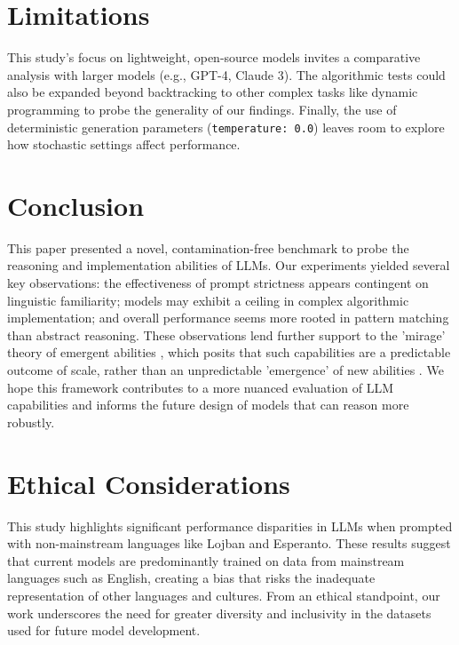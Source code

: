 \documentclass[11pt]{article}
\begin{document}
\section{Limitations}
\label{sec:limitations}
This study's focus on lightweight, open-source models invites a comparative analysis with larger models (e.g., GPT-4, Claude 3). The algorithmic tests could also be expanded beyond backtracking to other complex tasks like dynamic programming to probe the generality of our findings. Finally, the use of deterministic generation parameters (\texttt{temperature: 0.0}) leaves room to explore how stochastic settings affect performance.

\section{Conclusion}
\label{sec:conclusion}
This paper presented a novel, contamination-free benchmark to probe the reasoning and implementation abilities of LLMs. Our experiments yielded several key observations: the effectiveness of prompt strictness appears contingent on linguistic familiarity; models may exhibit a ceiling in complex algorithmic implementation; and overall performance seems more rooted in pattern matching than abstract reasoning. These observations lend further support to the 'mirage' theory of emergent abilities \cite{schaeffer2023mirage}, which posits that such capabilities are a predictable outcome of scale, rather than an unpredictable 'emergence' of new abilities \cite{wei2022emergent}. We hope this framework contributes to a more nuanced evaluation of LLM capabilities and informs the future design of models that can reason more robustly.

\section{Ethical Considerations}
\label{sec:ethical}
This study highlights significant performance disparities in LLMs when prompted with non-mainstream languages like Lojban and Esperanto. These results suggest that current models are predominantly trained on data from mainstream languages such as English, creating a bias that risks the inadequate representation of other languages and cultures. From an ethical standpoint, our work underscores the need for greater diversity and inclusivity in the datasets used for future model development.
\end{document}
